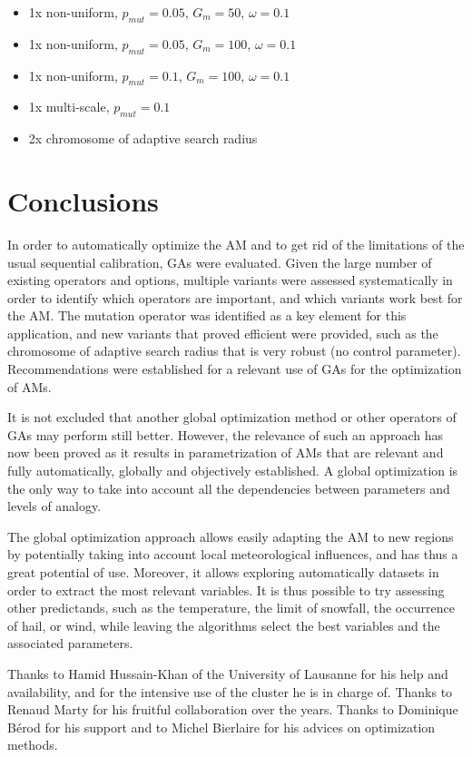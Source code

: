 \documentclass{ametsoc}
\begin{document}
\begin{itemize}
	\setlength\itemsep{-4px}
	\item 1x non-uniform, $p_{mut}=0.05$, $G_{m}=50$, $\omega=0.1$
	\item 1x non-uniform, $p_{mut}=0.05$, $G_{m}=100$, $\omega=0.1$
	\item 1x non-uniform, $p_{mut}=0.1$, $G_{m}=100$, $\omega=0.1$
	\item 1x multi-scale,  $p_{mut}=0.1$
	\item 2x chromosome of adaptive search radius
\end{itemize}


\section{Conclusions}

In order to automatically optimize the AM and to get rid of the limitations of the usual sequential calibration, GAs were evaluated. Given the large number of existing operators and options, multiple variants were assessed systematically in order to identify which operators are important, and which variants work best for the AM. The mutation operator was identified as a key element for this application, and new variants that proved efficient were provided, such as the chromosome of adaptive search radius that is very robust (no control parameter). Recommendations were established for a relevant use of GAs for the optimization of AMs. 

It is not excluded that another global optimization method or other operators of GAs may perform still better. However, the relevance of such an approach has now been proved as it results in parametrization of AMs that are relevant and fully automatically, globally and objectively established. A global optimization is the only way to take into account all the dependencies between parameters and levels of analogy.

The global optimization approach allows easily adapting the AM to new regions by potentially taking into account local meteorological influences, and has thus a great potential of use. Moreover, it allows exploring automatically datasets in order to extract the most relevant variables. It is thus possible to try assessing other predictands, such as the temperature, the limit of snowfall, the occurrence of hail, or wind, while leaving the algorithms select the best variables and the associated parameters.


%
\acknowledgments
Thanks to Hamid Hussain-Khan of the University of Lausanne for his help and availability, and for the intensive use of the cluster he is in charge of. Thanks to Renaud Marty for his fruitful collaboration over the years. Thanks to Dominique B\'{e}rod for his support and to Michel Bierlaire for his advices on optimization methods.
\end{document}
